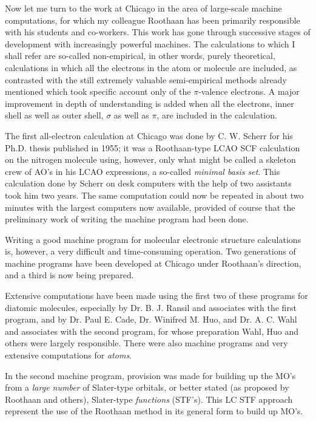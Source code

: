 \documentclass[11pt]{memoir}
\begin{document}
Now let me turn to the work at Chicago in the area of large-scale machine computations, for which my colleague Roothaan has been primarily responsible with his students and co-workers.  This work has gone through successive stages of development with increasingly powerful machines.  The calculations to which I shall refer are so-called non-empirical, in other words, purely theoretical, calculations in which all the electrons in the atom or molecule are included, as contrasted with the still extremely valuable semi-empirical methods already mentioned which took specific account only of the $\pi$-valence electrons.  A major improvement in depth of understanding is added when all the electrons, inner shell as well as outer shell, $\sigma$ as well as $\pi$, are included in the calculation.

The first all-electron calculation at Chicago was done by C. W. Scherr for his Ph.D. thesis published in 1955; it was a Roothaan-type LCAO SCF calculation on the nitrogen molecule using, however, only what might be called a skeleton crew of AO's in his LCAO expressions, a so-called \emph{minimal basis set}.  This calculation done by Scherr on desk computers with the help of two assistants took him two years.  The same computation could now be repeated in about two minutes with the largest computers now available, provided of course that the preliminary work of writing the machine program had been done.

Writing a good machine program for molecular electronic structure calculations is, however, a very difficult and time-consuming operation.  Two generations of machine programs have been developed at Chicago under Roothaan's direction, and a third is now being prepared.

Extensive computations have been made using the first two of these programs for diatomic molecules, especially by Dr. B. J. Ransil and associates with the first program, and by Dr. Paul E. Cade, Dr. Winifred M. Huo, and Dr. A. C. Wahl and associates with the second program, for whose preparation Wahl, Huo and others were largely responsible.  There were also machine programs and very extensive computations for \emph{atoms}.

In the second machine program, provision was made for building up the MO's from a \emph{large number} of Slater-type orbitals, or better stated (as proposed by Roothaan and others), Slater-type \emph{functions} (STF's).  This LC STF approach represent the use of the Roothaan method in its general form to build up MO's.
\end{document}
